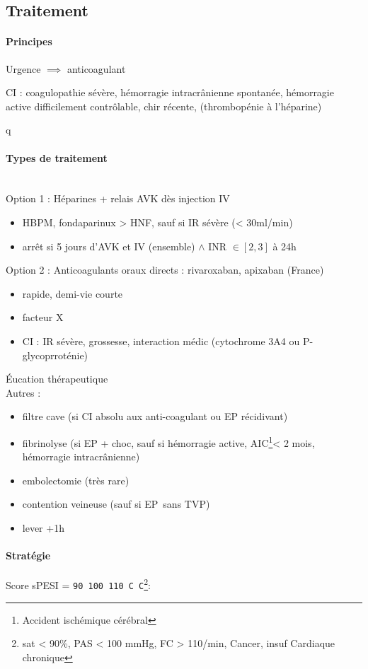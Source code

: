 \subsection{Traitement}
\paragraph{Principes}
Urgence \skull $\implies$ anticoagulant

CI : coagulopathie sévère, hémorragie intracrânienne spontanée, hémorragie
active difficilement contrôlable, chir récente, (thrombopénie à l'héparine)

q\paragraph{Types de traitement}\mbox{}\\
Option 1 : Héparines + relais AVK dès injection IV
\begin{itemize}
\item HBPM, fondaparinux > HNF, sauf si IR sévère (< 30ml/min)
\item arrêt si 5 jours d'AVK et IV (ensemble) $\wedge$ INR $\in [2,3]$ à 24h
\end{itemize}
Option 2 : Anticoagulants oraux directs : rivaroxaban, apixaban (France)
\begin{itemize}
\item rapide, demi-vie courte
\item facteur X
\item CI : IR sévère, grossesse, interaction médic (cytochrome 3A4 ou
  P-glycoprroténie)
\end{itemize}
Éucation thérapeutique\\
Autres :
\begin{itemize}
\item filtre cave (si CI absolu aux anti-coagulant ou EP récidivant)
\item fibrinolyse (si EP + choc, sauf si hémorragie active,
  AIC\footnote{Accident ischémique cérébral}< 2 mois,
  hémorragie intracrânienne)
\item embolectomie (très rare)
\item contention veineuse (sauf si EP sans TVP)
\item lever +1h
\end{itemize}

\paragraph{Stratégie}
Score sPESI = \texttt{90 100 110 C C}\footnote{sat < 90\%, PAS < 100 mmHg, FC >
110/min, Cancer, insuf Cardiaque chronique}:

